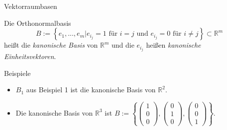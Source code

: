 \documentclass[
  8pt,
  ignorenonframetext,
]{beamer}
\begin{document}
\begin{frame}{Vektorraumbasen}
\protect\hypertarget{vektorraumbasen-6}{}
\small
\begin{definition}
Die Orthonormalbasis
\begin{equation}
B :=
\left\lbrace
e_1,...,e_m
\vert
e_{i_j} = 1 \mbox{ für } i =  j \mbox{ und } e_{i_j} =  0 \mbox{ für } i \neq j
\right\rbrace
\subset \mathbb{R}^m
\end{equation}
heißt die \textit{kanonische Basis} von $\mathbb{R}^m$ und die $e_{i_j}$ heißen
\textit{kanonische Einheitsvektoren}.
\end{definition}

Beispiele

\begin{itemize}
\item
  \(B_1\) aus Beispiel 1 ist die kanonische Basis von \(\mathbb{R}^2\).
\item
  Die kanonische Basis von \(\mathbb{R}^3\) ist
  \(B := \left\lbrace \begin{pmatrix} 1 \\ 0 \\ 0 \end{pmatrix}, \begin{pmatrix} 0 \\ 1 \\ 0 \end{pmatrix}, \begin{pmatrix} 0 \\ 0 \\ 1 \end{pmatrix} \right\rbrace\).
\end{itemize}
\end{frame}
\end{document}
